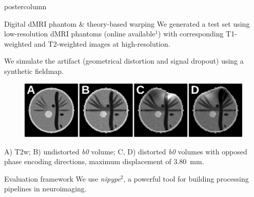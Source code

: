 \documentclass[final,hyperref={pdfpagelabels=false}]{beamer}
\newlength{\columnheight}
\begin{document}
\begin{frame}[t]
{\begin{minipage}[t][\columnheight][c]{0.95\textwidth}
{\begin{columns}[T,totalwidth=\textwidth]
    \begin{column}{.64\linewidth}
      \begin{beamercolorbox}[center,wd=\textwidth]{postercolumn}
        \begin{minipage}[T]{.95\textwidth} %
          \parbox[t]{\textwidth}{ %
	        \begin{block}{Digital dMRI phantom \& theory-based warping}
          We generated a test set using low-resolution dMRI phantoms (online available$^{1}$)
          with corresponding T1-weighted and T2-weighted images at high-resolution.

          We simulate the artifact (geometrical distortion and signal dropout) using a synthetic fieldmap.
              \begin{figure}[thpb]
                 \centering
                 \includegraphics[width=0.95\columnwidth]{Fig01-Phantom}
              \end{figure}
              A) T2w; B) undistorted \textit{b0} volume;
                 C, D) distorted \textit{b0} volumes with opposed phase 
                 encoding directions, maximum displacement of 3.80~mm.
          \end{block}

          \begin{block}{Evaluation framework}
          We use \emph{nipype}$^{2}$, a powerful tool for building processing pipelines in
          neuroimaging.


\end{block}}
\end{minipage}
\end{beamercolorbox}
\end{column}
\end{columns}}
\end{minipage}}
\end{frame}
\end{document}
